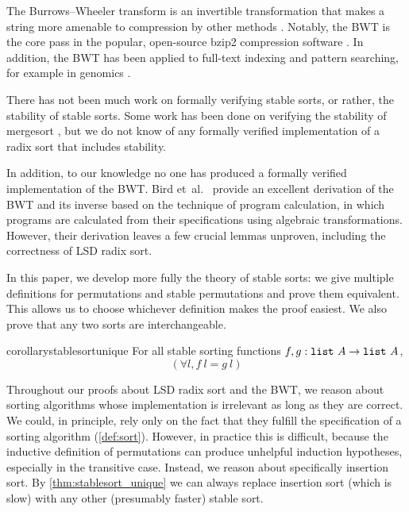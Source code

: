 \documentclass[sigplan,10pt,anonymous,review]{thesis}
\begin{document}
The Burrows--Wheeler transform is an invertible transformation that
makes a string more amenable to compression by other methods
\cite{bw}. Notably, the BWT is the core pass in the popular,
open-source bzip2 compression software \cite{tsai_2016}. In addition,
the BWT has been applied to full-text indexing and pattern searching,
for example in genomics \cite{ferragina_index, dna}.

There has not been much work on formally verifying stable sorts, or
rather, the stability of stable sorts. Some work has been done on
verifying the stability of mergesort
\cite{leroy_2018,Sternagel2013,Leino2015,deGouw2014}, but we do not
know of any formally verified implementation of a radix sort that
includes stability.

In addition, to our knowledge no one has produced a formally verified
implementation of the BWT. Bird et~al.\ \cite{alg-of-prog,birdmu}
provide an excellent derivation of the BWT and its inverse based on
the technique of program calculation, in which programs are calculated
from their specifications using algebraic transformations. However,
their derivation leaves a few crucial lemmas unproven, including the
correctness of LSD radix sort.

In this paper, we develop more fully the theory of stable sorts: we
give multiple definitions for permutations and stable permutations and
prove them equivalent. This allows us to choose whichever definition
makes the proof easiest. We also prove that any two sorts are
interchangeable.
\begin{restatable*}{corollary}{stablesortunique}
  \label{thm:stablesort_unique}
  For all stable sorting functions $f, g: \texttt{\textup{list}}~A \to
  \texttt{\textup{list}}~A$,
  \begin{equation*}
    (\forall l,f~l = g~l)
  \end{equation*}
\end{restatable*}

Throughout our proofs about LSD radix sort and the BWT, we reason
about sorting algorithms whose implementation is irrelevant as long as
they are correct. We could, in principle, rely only on the fact that
they fulfill the specification of a sorting algorithm
(\cref{def:sort}). However, in practice this is difficult, because the
inductive definition of permutations can produce unhelpful induction
hypotheses, especially in the transitive case. Instead, we reason
about specifically insertion sort. By \cref{thm:stablesort_unique} we
can always replace insertion sort (which is slow) with any other
(presumably faster) stable sort.
\end{document}
